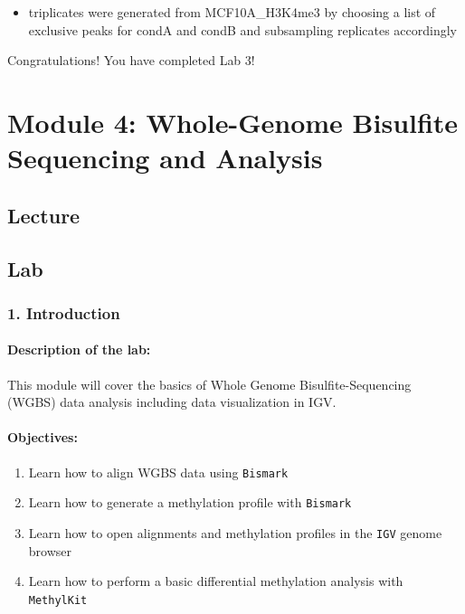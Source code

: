 \documentclass[
]{book}
\providecommand{\tightlist}{%
  \setlength{\itemsep}{0pt}\setlength{\parskip}{0pt}}
\begin{document}
\begin{itemize}
\tightlist
\item
  triplicates were generated from MCF10A\_H3K4me3 by choosing a list of exclusive peaks for condA and condB and subsampling replicates accordingly
\end{itemize}

Congratulations! You have completed Lab 3!

\chapter{Module 4: Whole-Genome Bisulfite Sequencing and Analysis}\label{module-4-whole-genome-bisulfite-sequencing-and-analysis}

\section{Lecture}\label{lecture-3}

\section{Lab}\label{lab-3}

\subsection{1. Introduction}\label{introduction}

\subsubsection{Description of the lab:}\label{description-of-the-lab}

This module will cover the basics of Whole Genome Bisulfite-Sequencing (WGBS) data analysis including data visualization in IGV.

\subsubsection{Objectives:}\label{objectives}

\begin{enumerate}
\def\labelenumi{\arabic{enumi})}
\tightlist
\item
  Learn how to align WGBS data using \texttt{Bismark}
\item
  Learn how to generate a methylation profile with \texttt{Bismark}
\item
  Learn how to open alignments and methylation profiles in the \texttt{IGV} genome browser
\item
  Learn how to perform a basic differential methylation analysis with \texttt{MethylKit}
\end{enumerate}
\end{document}

